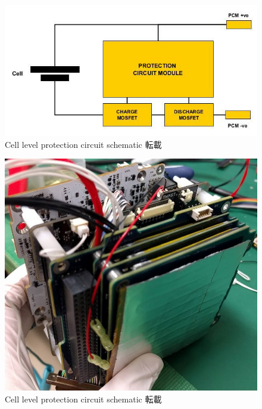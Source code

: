 \begin{figure}[htbp]
	\begin{center}
		\includegraphics[width=0.5\linewidth]{./03/fig/cell_protection.png}
		\caption{Cell level protection circuit schematic 転載}
		\label{cell_p}
	\end{center}
\end{figure}

\begin{figure}[htbp]
	\begin{center}
		\includegraphics[width=0.5\linewidth]{./03/fig/heater.jpg}
		\caption{Cell level protection circuit schematic 転載}
		\label{cell_p}
	\end{center}
\end{figure}

